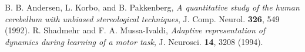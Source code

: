  B. B. Andersen, L. Korbo, and B. Pakkenberg, \emph{A quantitative study of the human cerebellum with unbiased stereological techniques}, J. Comp. Neurol. \textbf{326}, 549 (1992).
 R. Shadmehr and F. A. Mussa-Ivaldi, \emph{Adaptive representation of dynamics during learning of a motor task}, J. Neurosci. \textbf{14}, 3208 (1994).
